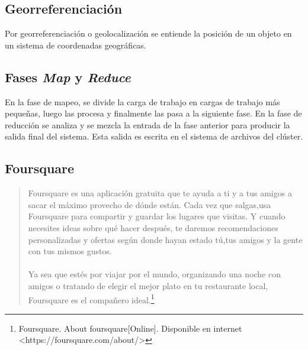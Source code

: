 \subsection{Georreferenciaci\'on}
Por georreferenciaci\'on o geolocalizaci\'on se entiende la posici\'on de un objeto en un sistema de coordenadas geogr\'aficas.
\subsection{Fases \textit{Map} y \textit{Reduce}}
En la fase de mapeo, se divide la carga de trabajo en cargas de trabajo m\'as peque\~nas, luego las procesa y finalmente las pasa a la siguiente fase. En la fase de reducci\'on se analiza y se mezcla la entrada de la fase anterior para producir la salida final del sistema. Esta salida es escrita en el sistema de archivos del cl\'uster.
\subsection{Foursquare}
\begin{quote}
Foursquare es una aplicaci\'on gratuita que te ayuda a ti y a tus amigos a sacar el m\'aximo provecho de d\'onde est\'an.​ Cada vez que salgas,​ usa Foursquare para compartir y guardar los lugares que visitas.​ Y cuando necesites ideas sobre qu\'e hacer despu\'es,​ te daremos recomendaciones personalizadas y ofertas seg\'un donde hayan estado t\'u,​ tus amigos y la gente con tus mismos gustos.​
\paragraph{}
Ya sea que est\'es por viajar por el mundo, organizando una noche con amigos o tratando de elegir el mejor plato en tu restaurante local, Foursquare es el compa\~nero ideal.\footnote{Foursquare. About foursquare[Online]. Disponible en internet \textless https://foursquare.com/about/\textgreater}
\end{quote}
